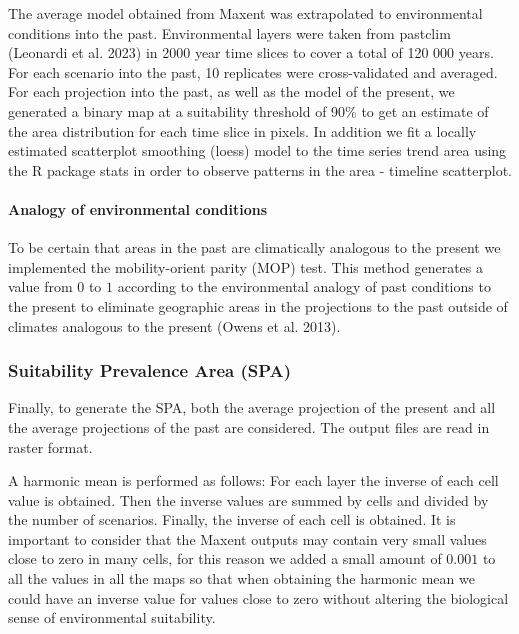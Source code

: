 \documentclass[
]{article}
\begin{document}
The average model obtained from Maxent was extrapolated to environmental
conditions into the past. Environmental layers were taken from pastclim
(Leonardi et al. 2023) in 2000 year time slices to cover a total of 120
000 years. For each scenario into the past, 10 replicates were
cross-validated and averaged. For each projection into the past, as well
as the model of the present, we generated a binary map at a suitability
threshold of 90\% to get an estimate of the area distribution for each
time slice in pixels. In addition we fit a locally estimated scatterplot
smoothing (loess) model to the time series trend area using the R
package stats in order to observe patterns in the area - timeline
scatterplot.

\hypertarget{analogy-of-environmental-conditions}{%
\paragraph{Analogy of environmental
conditions}\label{analogy-of-environmental-conditions}}

To be certain that areas in the past are climatically analogous to the
present we implemented the mobility-orient parity (MOP) test. This
method generates a value from \(0\) to \(1\) according to the
environmental analogy of past conditions to the present to eliminate
geographic areas in the projections to the past outside of climates
analogous to the present (Owens et al. 2013).

\hypertarget{suitability-prevalence-area-spa}{%
\subsubsection{Suitability Prevalence Area
(SPA)}\label{suitability-prevalence-area-spa}}

Finally, to generate the SPA, both the average projection of the present
and all the average projections of the past are considered. The output
files are read in raster format.

A harmonic mean is performed as follows: For each layer the inverse of
each cell value is obtained. Then the inverse values are summed by cells
and divided by the number of scenarios. Finally, the inverse of each
cell is obtained. It is important to consider that the Maxent outputs
may contain very small values close to zero in many cells, for this
reason we added a small amount of \(0.001\) to all the values in all the
maps so that when obtaining the harmonic mean we could have an inverse
value for values close to zero without altering the biological sense of
environmental suitability.
\end{document}
